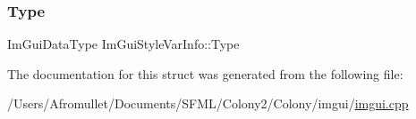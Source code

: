 \mbox{\label{struct_im_gui_style_var_info_a62f42d2bb7b71b7530493e16e622cb81}} 
\subsubsection{\texorpdfstring{Type}{Type}}
{\footnotesize\ttfamily Im\+Gui\+Data\+Type Im\+Gui\+Style\+Var\+Info\+::\+Type}



The documentation for this struct was generated from the following file\+:\begin{DoxyCompactItemize}
\item 
/\+Users/\+Afromullet/\+Documents/\+S\+F\+M\+L/\+Colony2/\+Colony/imgui/\mbox{\hyperlink{imgui_8cpp}{imgui.\+cpp}}\end{DoxyCompactItemize}
